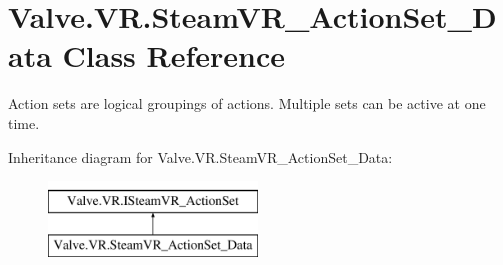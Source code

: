 \hypertarget{class_valve_1_1_v_r_1_1_steam_v_r___action_set___data}{}\section{Valve.\+V\+R.\+Steam\+V\+R\+\_\+\+Action\+Set\+\_\+\+Data Class Reference}
\label{class_valve_1_1_v_r_1_1_steam_v_r___action_set___data}


Action sets are logical groupings of actions. Multiple sets can be active at one time.  


Inheritance diagram for Valve.\+V\+R.\+Steam\+V\+R\+\_\+\+Action\+Set\+\_\+\+Data\+:\begin{figure}[H]
\begin{center}
\leavevmode
\includegraphics[height=2.000000cm]{class_valve_1_1_v_r_1_1_steam_v_r___action_set___data}
\end{center}
\end{figure}
